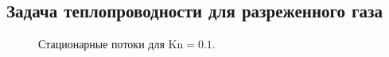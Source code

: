 \documentclass[a4paper,10pt]{article}
\newcommand{\Kn}{\mathrm{Kn}}
\begin{document}
\subsection{Задача теплопроводности для разреженного газа}
\begin{figure}[h]
	\caption{Стационарные потоки для \(\Kn=0.1\).}\label{fig:flows_rare}
\end{figure}
\end{document}
